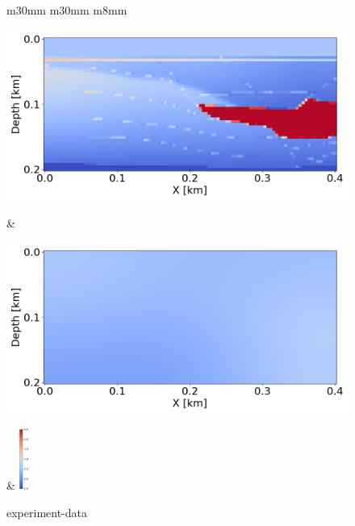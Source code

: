 \begin{figure}[t]
    \centering
    \begin{tabular}{m{30mm} m{30mm} m{8mm}}
        \begin{minipage}[b]{\linewidth}
            \centering
            \includegraphics[width=\linewidth]{public/true}
            \vspace{-9mm}
            \caption*{}
            \vspace{1mm}
        \end{minipage} &
        \begin{minipage}[b]{\linewidth}
            \centering
            \includegraphics[width=\linewidth]{public/initial}
            \vspace{-9mm}
            \caption*{}
            \vspace{1mm}
        \end{minipage} &
        \includegraphics[height=20mm]{public/color-bar}
    \end{tabular}
    \vspace{-3mm}
    \caption{experiment-data}
    \label{fig:experiment-data}
\end{figure}
